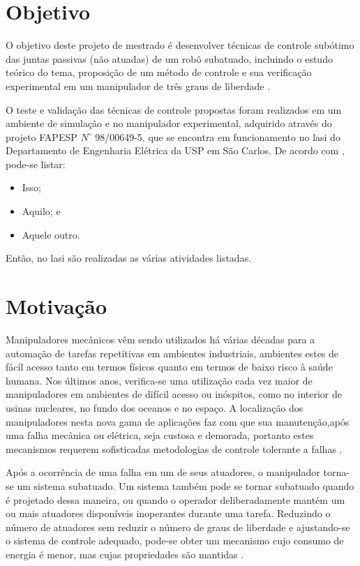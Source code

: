 \section{Objetivo}
O objetivo deste projeto de mestrado é desenvolver técnicas de controle subótimo das juntas passivas (não atuadas) de um robô subatuado, incluindo o estudo teórico do tema, proposição de um método de controle e sua verificação
experimental em um manipulador de três graus de liberdade \cite{Nascimento1970}.

O teste \cite{Patagonios2001} e validação das técnicas de controle propostas foram realizados em um ambiente de simulação e no manipulador
experimental, adquirido através do projeto FAPESP $N^{\circ}$ 98/00649-5, que se encontra em funcionamento no \gls{lasi} do Departamento de Engenharia Elétrica da USP em São Carlos. De acordo com \textcite{Furmento1995}, pode-se listar:
\begin{itemize}
\item Isso;
\item Aquilo; e
\item Aquele outro.
\end{itemize}

Então, no \gls{lasi} são realizadas as várias atividades listadas.

\section{Motivação}
Manipuladores mecânicos \cite{Sbornian2002} vêm sendo utilizados há várias décadas para a automação de tarefas
repetitivas em ambientes industriais, ambientes estes de fácil acesso tanto em termos físicos quanto em termos de baixo
risco à saúde humana. Nos últimos anos, verifica-se uma utilização cada vez maior de manipuladores em
ambientes de difícil acesso ou inóspitos, como no interior de usinas nucleares, no fundo dos oceanos e no
espaço. A localização dos manipuladores nesta nova gama de aplicações faz com que sua manutenção,após uma falha mecânica ou elétrica, seja custosa e demorada, portanto estes mecanismos requerem sofisticadas
metodologias de controle tolerante a falhas \cite{ITALUS2004}.

Após a ocorrência de uma falha em um de seus atuadores, o manipulador torna-se um sistema subatuado. Um sistema também pode se tornar subatuado quando é projetado  dessa maneira, ou quando o operador deliberadamente mantém um ou mais atuadores disponíveis inoperantes durante uma tarefa. Reduzindo o número de atuadores sem reduzir o número de graus de
liberdade e ajustando-se o sistema de controle adequado, pode-se obter um mecanismo cujo consumo de energia é menor, mas cujas propriedades são mantidas \cite{Arystides1994}.

